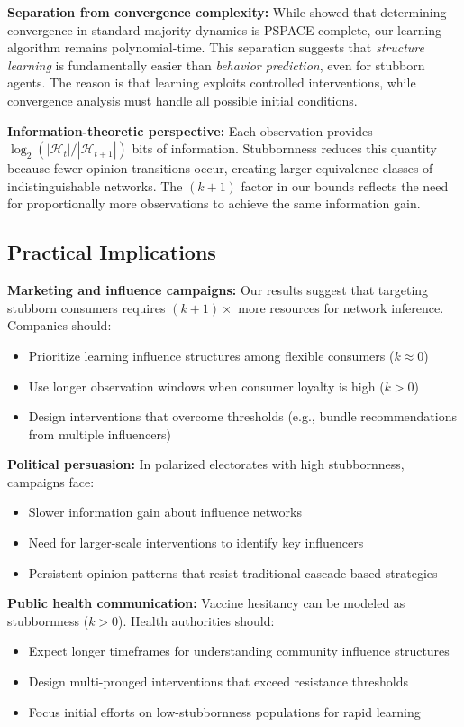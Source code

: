\documentclass[conference]{IEEEtran}
\begin{document}
\textbf{Separation from convergence complexity:} While \cite{chistikov2020convergence} showed that determining convergence in standard majority dynamics is PSPACE-complete, our learning algorithm remains polynomial-time. This separation suggests that \emph{structure learning} is fundamentally easier than \emph{behavior prediction}, even for stubborn agents. The reason is that learning exploits controlled interventions, while convergence analysis must handle all possible initial conditions.

\textbf{Information-theoretic perspective:} Each observation provides $\log_2(|\mathcal{H}_t|/|\mathcal{H}_{t+1}|)$ bits of information. Stubbornness reduces this quantity because fewer opinion transitions occur, creating larger equivalence classes of indistinguishable networks. The $(k+1)$ factor in our bounds reflects the need for proportionally more observations to achieve the same information gain.

\subsection{Practical Implications}

\textbf{Marketing and influence campaigns:} Our results suggest that targeting stubborn consumers requires $(k+1)\times$ more resources for network inference. Companies should:
\begin{itemize}
\item Prioritize learning influence structures among flexible consumers ($k \approx 0$)
\item Use longer observation windows when consumer loyalty is high ($k > 0$)
\item Design interventions that overcome thresholds (e.g., bundle recommendations from multiple influencers)
\end{itemize}

\textbf{Political persuasion:} In polarized electorates with high stubbornness, campaigns face:
\begin{itemize}
\item Slower information gain about influence networks
\item Need for larger-scale interventions to identify key influencers
\item Persistent opinion patterns that resist traditional cascade-based strategies
\end{itemize}

\textbf{Public health communication:} Vaccine hesitancy can be modeled as stubbornness ($k > 0$). Health authorities should:
\begin{itemize}
\item Expect longer timeframes for understanding community influence structures
\item Design multi-pronged interventions that exceed resistance thresholds
\item Focus initial efforts on low-stubbornness populations for rapid learning
\end{itemize}
\end{document}
